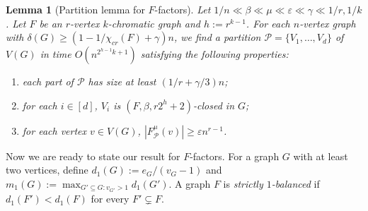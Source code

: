 \documentclass[11pt, letterpaper]{amsart}
\theoremstyle{plain}
\numberwithin{equation}{section}
\newtheorem{lemma}[thm]{Lemma}
\theoremstyle{definition}
\newcommand\card[1]{\left| #1 \right|}
\begin{document}
    
    \begin{lemma}
    [Partition lemma for $F$-factors]
    \label{better partition of packing}
        Let $ 1/n\ll \beta\ll\mu\ll\varepsilon\ll\gamma\ll 1/r,1/k$. 
        Let $F$ be an $r$-vertex $k$-chromatic graph and $h:=r^{k-1}$. 
        For each $n$-vertex graph with $\delta(G)\ge (1-1/{\chi}_{cr}(F)+\gamma)n$, we find a partition $\mathcal{P}=\{V_1,\dots,V_d\}$ of $ V(G) $ in time $O(n^{2^{h-1}k+1})$ satisfying the following properties:
	\begin{enumerate}[label=(F\arabic*)]
        \item each part of $ \mathcal{P} $ has size at least $ (1/r+\gamma/3)n $;\label{item:pack1}
        \item for each $ i\in[d] $, $ V_i $ is $ (F,\beta,r2^h+2) $-closed in $ G $;\label{item:pack3}
        \item for each vertex $ v\in V(G) $, $ \card{F^{\mu}_{\mathcal{P}}(v)}\ge \varepsilon n^{r-1} $.\label{item:pack2}
        \end{enumerate}
    \end{lemma}

Now we are ready to state our result for $F$-factors. 
For a graph \(G\) with at least two vertices, define \(d_1(G):=e_G/(v_G-1)\) and \(m_1(G):=\max_{G'\subseteq G:v_{G'}>1}d_1(G')\). 
A graph \(F\) is \emph{strictly \(1\)-balanced} if \(d_1(F')<d_1(F)\) for every \(F' \subsetneq F\).
\end{document}
